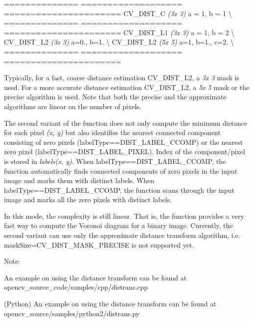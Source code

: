 ============== =================== ====================== {\ttfamily C\+V\+\_\+\+D\+I\+S\+T\+\_\+C} {\itshape (3x 3)} a = 1, b = 1 \textbackslash{} ============== =================== ====================== {\ttfamily C\+V\+\_\+\+D\+I\+S\+T\+\_\+\+L1} {\itshape (3x 3)} a = 1, b = 2 \textbackslash{} {\ttfamily C\+V\+\_\+\+D\+I\+S\+T\+\_\+\+L2} {\itshape (3x 3)} a=0., b=1. \textbackslash{} {\ttfamily C\+V\+\_\+\+D\+I\+S\+T\+\_\+\+L2} {\itshape (5x 5)} a=1, b=1., c=2. \textbackslash{} ============== =================== ======================

Typically, for a fast, coarse distance estimation {\ttfamily C\+V\+\_\+\+D\+I\+S\+T\+\_\+\+L2}, a {\itshape 3x 3} mask is used. For a more accurate distance estimation {\ttfamily C\+V\+\_\+\+D\+I\+S\+T\+\_\+\+L2}, a {\itshape 5x 5} mask or the precise algorithm is used. Note that both the precise and the approximate algorithms are linear on the number of pixels.

The second variant of the function does not only compute the minimum distance for each pixel {\itshape (x, y)} but also identifies the nearest connected component consisting of zero pixels ({\ttfamily label\+Type==D\+I\+S\+T\+\_\+\+L\+A\+B\+E\+L\+\_\+\+C\+C\+O\+MP}) or the nearest zero pixel ({\ttfamily label\+Type==D\+I\+S\+T\+\_\+\+L\+A\+B\+E\+L\+\_\+\+P\+I\+X\+EL}). Index of the component/pixel is stored in {\itshape labels(x, y)}. When {\ttfamily label\+Type==D\+I\+S\+T\+\_\+\+L\+A\+B\+E\+L\+\_\+\+C\+C\+O\+MP}, the function automatically finds connected components of zero pixels in the input image and marks them with distinct labels. When {\ttfamily label\+Type==D\+I\+S\+T\+\_\+\+L\+A\+B\+E\+L\+\_\+\+C\+C\+O\+MP}, the function scans through the input image and marks all the zero pixels with distinct labels.

In this mode, the complexity is still linear. That is, the function provides a very fast way to compute the Voronoi diagram for a binary image. Currently, the second variant can use only the approximate distance transform algorithm, i.\+e. {\ttfamily mask\+Size=C\+V\+\_\+\+D\+I\+S\+T\+\_\+\+M\+A\+S\+K\+\_\+\+P\+R\+E\+C\+I\+SE} is not supported yet.

Note\+:


\begin{DoxyItemize}
\item An example on using the distance transform can be found at opencv\+\_\+source\+\_\+code/samples/cpp/distrans.\+cpp 
\item (Python) An example on using the distance transform can be found at opencv\+\_\+source/samples/python2/distrans.\+py 
\end{DoxyItemize}


